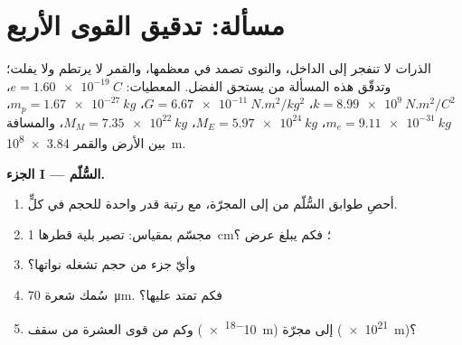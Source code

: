 \section{مسألة: تدقيق القوى الأربع}

\begin{problem}
\label{pb:g11:fundamental-interactions:1}
الذرات لا تنفجر إلى الداخل، والنوى تصمد في معظمها، والقمر لا يرتطم ولا
يفلت؛ وتدقّق هذه المسألة من يستحق الفضل. المعطيات:
$e = \qty{1.60e-19}{C}$،
$k = \qty{8.99e9}{N.m^2/C^2}$، $G = \qty{6.67e-11}{N.m^2/kg^2}$،
$m_p = \qty{1.67e-27}{kg}$، $m_e = \qty{9.11e-31}{kg}$،
$M_E = \qty{5.97e24}{kg}$، $M_M = \qty{7.35e22}{kg}$، والمسافة بين الأرض
والقمر \qty{3.84e8}{m}.

\medskip
\noindent\textbf{الجزء I --- السُّلّم.}
\begin{enumerate}
  \item أحصِ طوابق السُّلّم من  إلى المجرّة، مع رتبة
        قدر واحدة للحجم في كلٍّ.
  \item مجسّم بمقياس: تصير  بلية قطرها \qty{1}{cm}؛ فكم يبلغ عرض
        ؟
  \item وأيّ جزء من حجم  تشغله نواتها؟
  \item سُمك شعرة \qty{70}{\micro m}. فكم  تمتد عليها؟
  \item وكم  من قوى العشرة من سقف  (\qty{e-18}{m})
        إلى مجرّة (\qty{e21}{m})؟
\end{enumerate}


\end{problem}
